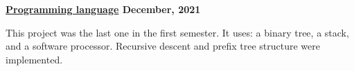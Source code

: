 \textbf{\href{https://github.com/jirol9xa/the-language-of-geniuses} {Programming language} \hfill December, 2021}\par

\begin{itemize}
	This project was the last one in the first semester. It uses: a binary tree, a stack, and a software processor. Recursive descent and prefix tree structure were implemented. 
\end{itemize}\par